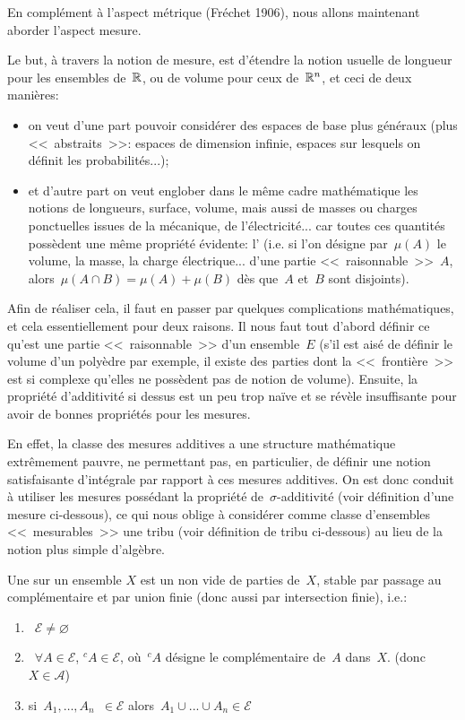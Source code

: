 En complément à l'aspect métrique (Fréchet 1906), nous
allons maintenant aborder l'aspect mesure.

\medskip
Le but, à travers la notion de mesure, est d'étendre la notion usuelle de longueur pour les ensembles
de~$\mathbb R$, ou de volume pour ceux de~$\mathbb R^n$, et ceci de deux manières:
\begin{itemize}
\item on veut d'une part pouvoir considérer des espaces de base plus généraux (plus <<~abstraits~>>:
espaces de dimension infinie, espaces sur lesquels on définit les probabilités...); 
\item et
d'autre part on veut englober dans le même cadre mathématique les notions de longueurs, 
surface, volume, mais aussi de masses ou charges ponctuelles issues de la mécanique, de
l'électricité... car toutes ces quantités possèdent une même propriété évidente: l'
(i.e. si l'on désigne par~$\mu(A)$ le volume, la masse, la charge électrique... d'une partie <<~raisonnable~>>~$A$,
alors~$\mu(A\cap B)=\mu(A)+\mu(B)$ dès que~$A$ et~$B$ sont disjoints).
\end{itemize}

\medskip
Afin de réaliser cela, il faut en passer par quelques complications mathématiques, et cela essentiellement
pour deux raisons.
Il nous faut tout d'abord définir ce qu'est une partie <<~raisonnable~>> d'un ensemble~$E$ (s'il est
aisé de définir le volume d'un polyèdre par exemple, il existe des parties dont la <<~frontière~>> est
si complexe qu'elles ne possèdent pas de notion de volume).
Ensuite, la propriété d'additivité si dessus est un peu trop naïve et se révèle insuffisante pour avoir de bonnes 
propriétés pour les mesures.

En effet, la classe des mesures additives a une structure mathématique extrêmement pauvre, ne permettant pas, 
en particulier, de définir une notion satisfaisante d'intégrale par rapport à ces mesures additives.
On est donc conduit à utiliser les mesures possédant la propriété de~$\sigma$-additivité (voir définition
d'une mesure ci-dessous), ce qui nous oblige à considérer comme classe d'ensembles <<~mesurables~>> une 
tribu (voir définition de tribu ci-dessous) au lieu de la notion plus simple d'algèbre.

\medskip
\begin{definition}[Algèbre]
Une  sur un ensemble 
$X$ est un  non vide de parties de~$X$, stable par passage au complémentaire et par union finie
(donc aussi par intersection finie), i.e.:
\begin{enumerate}
 \item~$\mathcal{E} \not=\varnothing$
 \item~$\forall A \in \mathcal{E}$, ${}^c A \in\mathcal{E}$, où~${}^cA$ désigne le complémentaire de~$A$ dans~$X$.
	(donc~$X\in \mathcal{A}$)
\item si~$A_1,\ldots,A_n$~$\in\mathcal{E}$ alors~$A_1\cup ...\cup A_n \in\mathcal{E}$
\end{enumerate}
\end{definition}

